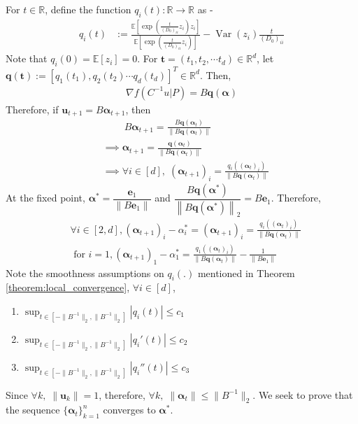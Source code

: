 \documentclass[letterpaper]{article}
\newcommand{\ba}[1]{\begin{align}#1\end{align}}
\newcommand{\bas}[1]{\begin{align*}#1\end{align*}}
\newcommand{\bu}{\pmb{u}}
\newcommand{\balpha}{\pmb{\alpha}}
\newcommand{\be}{\pmb{e}}
\newcommand{\bq}{\pmb{q}}
\newcommand{\bb}[1]{\left(#1\right)}
\newcommand{\bbb}[1]{\left[#1\right]}
\DeclareMathOperator{\Var}{Var}
\begin{document}
For $t \in \mathbb{R}$, define the function $q_{i}\bb{t} : \mathbb{R} \rightarrow \mathbb{R}$ as - 
\bas{
    q_{i}\bb{t} &:= \frac{\mathbb{E}\bbb{\exp\bb{\frac{t}{\bb{D_{0}}_{ii}}z_{i}}z_{i}}}{\mathbb{E}\bbb{\exp\bb{\frac{t}{\bb{D_{0}}_{ii}}z_{i}}}} -\Var\bb{z_{i}}\frac{t}{\bb{D_{0}}_{ii}}
}
Note that $q_{i}\bb{0} = \mathbb{E}\bbb{z_{i}} = 0$.
For $\bm{t} = \bb{t_1, t_2, \cdots t_d} \in \mathbb{R}^{d}$, let $\bm{q}\bb{\bm{t}} := [q_{1}\bb{t_1}, q_{2}\bb{t_2} \cdots q_{d}\bb{t_d}]^{T} \in \mathbb{R}^{d}$. Then, 
\bas{
    \nabla f\bb{C^{-1}u|P} = B\bm{q}\bb{\balpha}
}
Therefore, if $\bu_{t+1} = B\balpha_{t+1}$, then
\bas{
    & \;\;\;\;\;\;\;\; B\balpha_{t+1} = \frac{B\bm{q}\bb{\balpha_{t}}}{\left\|B\bm{q}\bb{\balpha_{t}}\right\|} \\ 
    & \implies \balpha_{t+1} = \frac{\bm{q}\bb{\balpha_{t}}}{\left\|B\bm{q}\bb{\balpha_{t}}\right\|} \\ 
    & \implies \forall i \in [d], \; \bb{\balpha_{t+1}}_{i} = \frac{q_{i}\bb{\bb{\balpha_{t}}_{i}}}{\left\|B\bm{q}\bb{\balpha_{t}}\right\|}
}
At the fixed point, $\balpha^{*} = \dfrac{\be_{1}}{\|B\be_{1}\|}$ and $\dfrac{B\bq\bb{\balpha^{*}}}{\left\|B\bq\bb{\balpha^{*}}\right\|_{2}} = B\be_{1}$. Therefore, 
\ba{
    & \forall i \in [2,d], \bb{\balpha_{t+1}}_{i} - \alpha^{*}_{i} = \bb{\balpha_{t+1}}_{i} = \frac{q_{i}\bb{\bb{\balpha_{t}}_{i}}}{\left\|B\bm{q}\bb{\balpha_{t}}\right\|} \label{eq:i_not_1} \\ 
    & \text{ for } i = 1, \bb{\balpha_{t+1}}_{1} - \alpha^{*}_{1} = \frac{q_{1}\bb{\bb{\balpha_{t}}_{i}}}{\left\|B\bm{q}\bb{\balpha_{t}}\right\|} - \frac{1}{\|B\be_{1}\|} \label{eq:i_eq_1}
}
\noindent
Note the smoothness assumptions on $q_{i}(.)$ mentioned in Theorem \ref{theorem:local_convergence}, $\forall i \in [d]$, 
\begin{enumerate}
    \item $\sup_{t \in [-\|B^{-1}\|_{2},\|B^{-1}\|_{2}]}|q_{i}\bb{t}| \leq c_{1}$ 
    \item $\sup_{t \in [-\|B^{-1}\|_{2},\|B^{-1}\|_{2}]}|q_{i}'\bb{t}| \leq c_{2}$
    \item $\sup_{t \in [-\|B^{-1}\|_{2},\|B^{-1}\|_{2}]}|q_{i}''\bb{t}| \leq c_{3}$
\end{enumerate}
Since $\forall k, \; \|\bu_{k}\| = 1$, therefore, $\forall k, \; \|\balpha_{t}\| \leq \|B^{-1}\|_{2}$. We seek to prove that the sequence $\{\balpha_{t}\}_{k=1}^{n}$ converges to $\balpha^{*}$.
\end{document}
